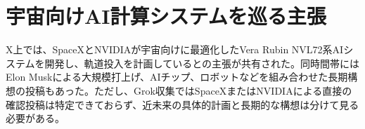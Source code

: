\section{宇宙向けAI計算システムを巡る主張}
X上では、SpaceXとNVIDIAが宇宙向けに最適化したVera Rubin NVL72系AIシステムを開発し、軌道投入を計画しているとの主張が共有された。同時間帯にはElon Muskによる大規模打上げ、AIチップ、ロボットなどを組み合わせた長期構想の投稿もあった。ただし、Grok収集ではSpaceXまたはNVIDIAによる直接の確認投稿は特定できておらず、近未来の具体的計画と長期的な構想は分けて見る必要がある。
